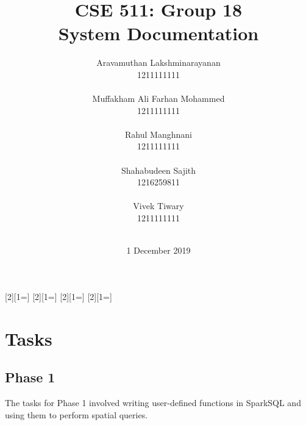\usepackage[colorinlistoftodos,prependcaption,textsize=footnotesize]{todonotes}
[2][1=]{\textcolor{Red}
{}}
[2][1=]{\textcolor{Blue}
{}}
[2][1=]{\textcolor{OliveGreen}{}}
[2][1=]{\textcolor{Plum}{}}





\title{
{\Huge CSE 511: Group 18{\large\linebreak\\} System Documentation{\large\linebreak\\}}
}
\author{
Aravamuthan Lakshminarayanan\\
1211111111\\\\
Muffakham Ali Farhan Mohammed\\
1211111111\\\\
Rahul Manghnani\\
1211111111\\\\
Shahabudeen Sajith\\
1216259811\\\\
Vivek Tiwary\\
1211111111\\\\
}
\date{1 December 2019}
\maketitle
\newpage


\tableofcontents\label{c}
\newpage

\section{Tasks} \label{Tasks}
	\subsection{Phase 1} \label{Phase 1}
    The tasks for Phase 1 involved writing user-defined functions in SparkSQL and using them to perform spatial queries.\\
    
